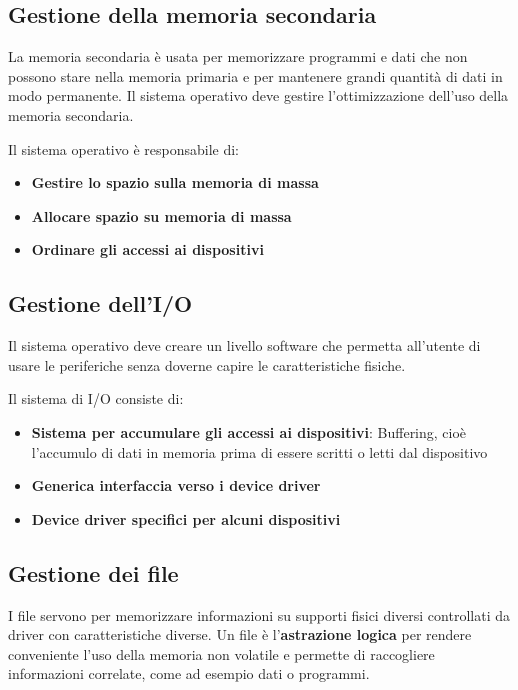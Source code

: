 \documentclass[a4paper]{article}
\begin{document}
\subsection{Gestione della memoria secondaria}
La memoria secondaria è usata per memorizzare programmi e dati che non possono stare
nella memoria primaria e per mantenere grandi quantità di dati in modo permanente. Il
sistema operativo deve gestire l'ottimizzazione dell'uso della memoria secondaria.

\vspace{1em}
\noindent
Il sistema operativo è responsabile di:
\begin{itemize}
  \item \textbf{Gestire lo spazio sulla memoria di massa}

  \item \textbf{Allocare spazio su memoria di massa}

  \item \textbf{Ordinare gli accessi ai dispositivi}
\end{itemize}

\subsection{Gestione dell'I/O}
Il sistema operativo deve creare un livello software che permetta all'utente di usare
le periferiche senza doverne capire le caratteristiche fisiche.

\vspace{1em}
\noindent
Il sistema di I/O consiste di:
\begin{itemize}
  \item \textbf{Sistema per accumulare gli accessi ai dispositivi}: Buffering, cioè
    l'accumulo di dati in memoria prima di essere scritti o letti dal dispositivo

  \item \textbf{Generica interfaccia verso i device driver}

  \item \textbf{Device driver specifici per alcuni dispositivi}
\end{itemize}

\subsection{Gestione dei file}
I file servono per memorizzare informazioni su supporti fisici diversi controllati da
driver con caratteristiche diverse. Un file è l'\textbf{astrazione logica} per rendere
conveniente l'uso della memoria non volatile e permette di raccogliere informazioni
correlate, come ad esempio dati o programmi.
\end{document}
